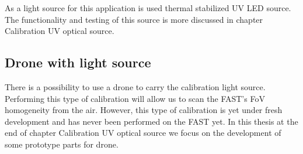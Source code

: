 \par
As a light source for this application is used thermal stabilized UV LED source. The functionality and testing of this source is more discussed in chapter Calibration UV optical source.


\subsection{Drone with light source}
There is a possibility to use a drone to carry the calibration light source. Performing this type of calibration will allow us to scan the FAST's FoV homogeneity from the air. However, this type of calibration is yet under fresh development and has never been performed on the FAST yet. In this thesis at the end of chapter Calibration UV optical source we focus on the development of some prototype parts for drone.





